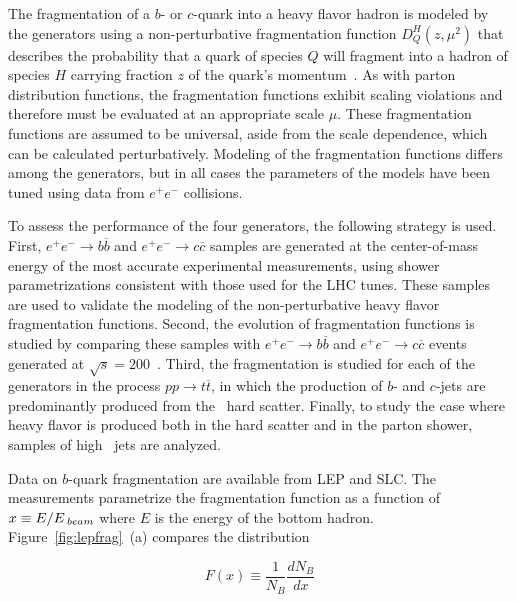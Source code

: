 
The fragmentation of a $b$- or $c$-quark into a heavy flavor hadron is modeled by the
generators using a non-perturbative fragmentation function $D_{Q}^{H}(z,\mu^2)$ that describes
the probability that a quark of species $Q$ will fragment into a hadron of species $H$ carrying
fraction $z$ of the quark's momentum~\cite{PhysRevD.86.010001}.  As with parton distribution functions, the fragmentation
functions exhibit scaling violations and therefore must be evaluated at an appropriate
scale $\mu$.  These fragmentation functions are assumed to be universal, aside from the
scale dependence, which can be calculated perturbatively. Modeling of the fragmentation functions differs among the generators, but
in all cases the parameters of the models have been tuned using data from
$e^+e^-$ collisions.  

To assess the performance of the four generators, the following strategy is used.  First,
$e^+e^-\rightarrow b\overline b$  and $e^+e^-\rightarrow c\overline c$ samples are generated 
at the center-of-mass energy of the most accurate experimental measurements, using shower parametrizations consistent with those used for the LHC tunes.
These samples
are used to validate the modeling of the non-perturbative heavy flavor fragmentation functions.
Second, the evolution of fragmentation functions is studied by comparing these samples with
$e^+e^-\rightarrow b\overline b$  and $e^+e^-\rightarrow c\overline c$ events generated at
$\sqrt{s}=200$~\GeV.  Third, the fragmentation is studied for each of the
generators in the process $pp \rightarrow t \overline t$, in which the production of $b$- and $c$-jets are predominantly produced from the \ttbar\ hard scatter. Finally, to study
the case where heavy flavor is produced both in the hard scatter and in the parton
shower, samples of high \pT\ jets are analyzed.

Data on $b$-quark
fragmentation are available from LEP and SLC.  The measurements 
parametrize the fragmentation function as a function of $x \equiv E/E_{\textrm\;beam}$ where
$E$ is the energy of the bottom hadron.  Figure~\ref{fig:lepfrag}~(a) compares the distribution 

$$F(x) \equiv \frac{1}{N_{B}} \frac{dN_{B}}{dx}$$

